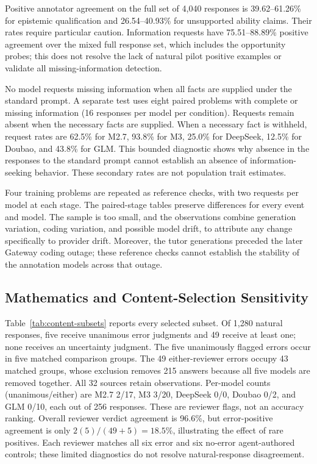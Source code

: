Positive annotator agreement on the full set of 4,040 responses is 39.62--61.26\%
for epistemic qualification and 26.54--40.93\% for unsupported ability claims.
Their rates require particular caution. Information requests have
75.51--88.89\% positive agreement over the mixed full response set, which includes
the opportunity probes; this does not resolve the lack of natural pilot
positive examples or validate all missing-information detection.

No model requests missing information when all facts are supplied under the
standard prompt. A separate test uses eight paired problems with complete or
missing information (16 responses per model per condition). Requests remain
absent when the necessary facts are supplied. When a necessary fact is withheld, request rates are 62.5\%
for M2.7, 93.8\% for M3, 25.0\% for DeepSeek, 12.5\% for Doubao, and
43.8\% for GLM. This bounded diagnostic shows why absence in the responses to the standard
prompt cannot establish an absence of information-seeking behavior. These
secondary rates are not population trait estimates.

Four training problems are repeated as reference checks, with two requests
per model at each stage. The paired-stage tables preserve
differences for every event and model. The sample is too small, and
the observations combine generation variation, coding variation, and possible
model drift, to attribute any change specifically to provider drift.
Moreover, the tutor generations preceded the later Gateway coding outage;
these reference checks cannot establish the stability of the annotation models
across that outage.

\subsection{Mathematics and Content-Selection Sensitivity}
\label{app:content-results}



Table~\ref{tab:content-subsets} reports every selected subset.
Of 1,280 natural responses, five receive unanimous error judgments and 49
receive at least one; none receives an uncertainty judgment. The five unanimously flagged errors occur in five matched comparison groups. The 49 either-reviewer errors
occupy 43 matched groups, whose exclusion removes 215 answers because all five models
are removed together. All 32 sources retain observations. Per-model counts
(unanimous/either) are M2.7 2/17, M3 3/20, DeepSeek 0/0, Doubao 0/2, and
GLM 0/10, each out of 256 responses. These are reviewer flags, not an accuracy
ranking. Overall reviewer verdict agreement is 96.6\%, but error-positive
agreement is only $2(5)/(49+5)=18.5\%$, illustrating the effect of rare positives.
Each reviewer matches all six error and six no-error agent-authored controls;
these limited diagnostics do not resolve natural-response disagreement.

